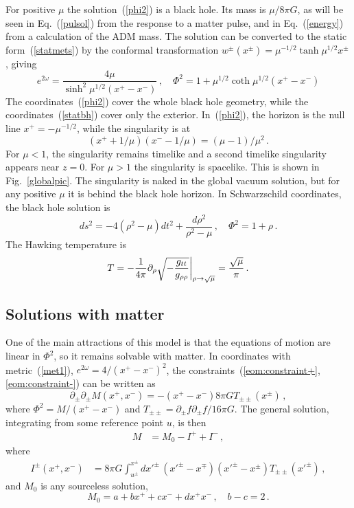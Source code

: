 \documentclass[12pt]{article}
\newcommand{\AAl}[1]{{\emph{\textcolor{blue}{#1}}}}
\newcommand{\be}{\begin{equation}}
\newcommand{\ee}{\end{equation}}
\begin{document}
For positive $\mu$ the solution~(\ref{phi2}) is a black hole.  Its mass is $\mu/8\pi G$, as will be seen in Eq.~(\ref{pulsol}) from the response to a matter pulse, and in Eq.~(\ref{energy}) from a calculation of the ADM mass.  The solution can be converted to the static form~(\ref{statmets}) by the conformal transformation $w^\pm(x^\pm) = \mu^{-1/2}\tanh \mu^{1/2}x^{\pm}$, giving
\be
e^{2\omega} = \frac{4\mu}{\sinh^2\mu^{1/2}(x^+ - x^-)} \,,\quad
\Phi^2 = 1+ \mu^{1/2}\coth\mu^{1/2}(x^+ - x^-) \label{statbh}
\ee
The coordinates~(\ref{phi2}) cover the whole black hole geometry, while the coordinates~(\ref{statbh}) cover only the exterior.  In~(\ref{phi2}), the horizon is the null line $x^+ = - \mu^{-1/2}$, while %
the singularity is at
\be
(x^+ + 1/\mu)(x^- - 1/\mu) = (\mu - 1)/\mu^2 \,.
\ee
For $\mu < 1$, the singularity remains timelike and a second timelike singularity appears near $z = 0$.  For $\mu > 1$ the singularity is spacelike.  This is shown in Fig.~\ref{globalpic}.  The singularity is naked in the global vacuum solution, but for any positive $\mu$ it is behind the black hole horizon.  In Schwarzschild coordinates, the black hole solution is
\be
ds^2 = - 4 (\rho^2 - \mu) dt^2 + \frac{ d\rho^2}{\rho^2 - \mu} \,, \quad \Phi^2 = 1 + \rho \,.
\ee
The Hawking temperature is
\begin{align}
T = -{1 \over 4 \pi} \partial_\rho \sqrt{-\frac{ g_{t t} }{g_{\rho\rho}}} \bigg|_{\rho \rightarrow \sqrt{\mu}} = {\sqrt{\mu} \over  \pi} \,.  \label{temp}
\end{align}

\subsection{Solutions with matter}


One of the main attractions of this model is that the equations of motion are linear in $\Phi^2$, so it remains solvable with matter.  
In coordinates with metric~(\ref{met1}), $e^{2\omega} = {4}/{(x^+ - x^-)^2}$, the constraints~(\ref{eom:constraint+},\ref{eom:constraint-}) can be written as
\be
\partial_\pm \partial_\pm M(x^+, x^-) = - (x^+ - x^-) 8\pi G T_{\pm\pm}(x^\pm)\,,
\ee
where $\Phi^2 = M/(x^+ - x^-) $ and $T_{\pm\pm} = \partial_\pm f \partial_\pm f/16\pi G$.
The general solution, integrating from some reference point $u$, is then
\begin{align}
M &= M_0 - I^+ + I^- \,,
\end{align}
where
\begin{align}
I^\pm(x^+, x^-) &= 8\pi G \int_{u^\pm}^{x^\pm} dx'^\pm\,
(x'^\pm - x^\mp)(x'^\pm - x^\pm) T_{\pm\pm}(x'^\pm) \,,
\end{align} 
and $M_0$ is any sourceless solution,
\be
M_0 = a + bx^+ + cx^- + dx^+ x^-\,, \quad b - c = 2\,.
\ee
\end{document}
